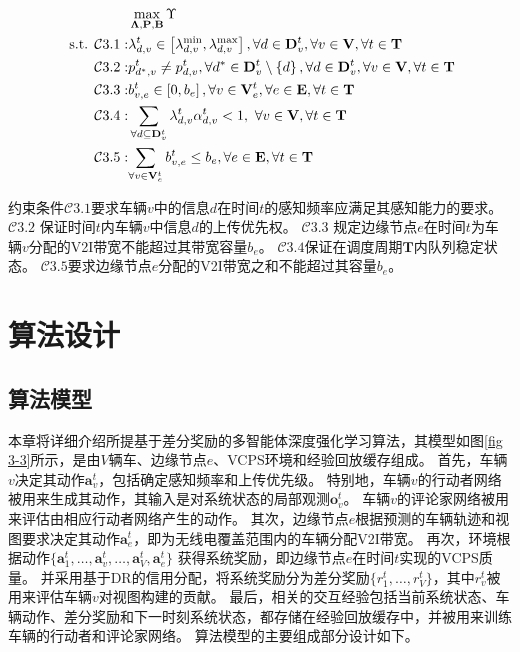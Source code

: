 \begin{align}
	&\max_{\bf\Lambda, \mathbf{P}, \mathbf{B}} \Upsilon \notag \\
	\text { s.t. }
    \mathcal{C}3.1: & \lambda_{d,v}^{t} \in \left [\lambda_{d,v}^{\min} , \lambda_{d,v}^{\max} \right ], \forall d \in \mathbf{D}_v^t , \forall v \in \mathbf{V}, \forall t \in \mathbf{T} \notag \\
     \mathcal{C}3.2: &{p}_{d^*, v}^t \neq {p}_{d, v}^t, \forall d^* \in \mathbf{D}_v^t \setminus \left\{ d\right \}, \forall d \in \mathbf{D}_v^t, \forall v \in \mathbf{V}, \forall t \in \mathbf{T} \notag \\
    \mathcal{C}3.3: & b_{v, e}^t \in \left[ 0 , b_e \right ], \forall v \in \mathbf{V}_e^t, \forall e \in \mathbf{E}, \forall t \in \mathbf{T} \notag \\
    \mathcal{C}3.4: & \sum_{\forall d \subseteq \mathbf{D}_v^t} \lambda_{d,v}^{t}  \alpha_{d, v}^t < 1,\ \forall v \in \mathbf{V}, \forall t \in \mathbf{T}  \notag \\
    \mathcal{C}3.5: & {\sum_{\forall v \in \mathbf{V}_e^{t}}b_{v, e}^t} \leq b_e, \forall e \in \mathbf{E}, \forall t \in \mathbf{T}
\end{align}


约束条件$\mathcal{C}3.1$要求车辆$v$中的信息$d$在时间$t$的感知频率应满足其感知能力的要求。
$\mathcal{C}3.2$ 保证时间$t$内车辆$v$中信息$d$的上传优先权。
$\mathcal{C}3.3$ 规定边缘节点$e$在时间$t$为车辆$v$分配的V2I带宽不能超过其带宽容量$b_e$。
$\mathcal{C}3.4$保证在调度周期$\mathbf{T}$内队列稳定状态。
$\mathcal{C}3.5$要求边缘节点$e$分配的V2I带宽之和不能超过其容量$b_e$。

\section{算法设计}\label{section 3-4}

\subsection{算法模型}
本章将详细介绍所提基于差分奖励的多智能体深度强化学习算法，其模型如图\ref{fig 3-3}所示，是由$V$辆车、边缘节点$e$、VCPS环境和经验回放缓存组成。
首先，车辆$v$决定其动作$\boldsymbol{a}_{v}^{t}$，包括确定感知频率和上传优先级。
特别地，车辆$v$的行动者网络被用来生成其动作，其输入是对系统状态的局部观测$\boldsymbol{o}_{v}^{t}$。
车辆$v$的评论家网络被用来评估由相应行动者网络产生的动作。
其次，边缘节点$e$根据预测的车辆轨迹和视图要求决定其动作$\boldsymbol{a}_{e}^{t}$，即为无线电覆盖范围内的车辆分配V2I带宽。
再次，环境根据动作$\{ \boldsymbol{a}_{1}^{t}, \ldots, \boldsymbol{a}_{v}^{t}, \ldots, \boldsymbol{a}_{V}^{t}, \boldsymbol{a}_{e}^{t}\}$ 获得系统奖励，即边缘节点$e$在时间$t$实现的VCPS质量。
并采用基于DR的信用分配，将系统奖励分为差分奖励$\{r_1^t, \ldots, r_{V}^t\}$，其中$r_v^t$被用来评估车辆$v$对视图构建的贡献。
最后，相关的交互经验包括当前系统状态、车辆动作、差分奖励和下一时刻系统状态，都存储在经验回放缓存中，并被用来训练车辆的行动者和评论家网络。
算法模型的主要组成部分设计如下。

